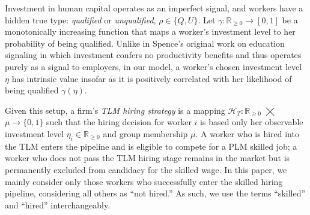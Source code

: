 \documentclass[sigconf]{acmart}
\theoremstyle{definition}
\begin{document}
Investment in human capital operates as an imperfect signal, and workers have a hidden true type: \emph{qualified} or \emph{unqualified}, $\rho \in \{Q, U\}$. Let $\gamma: \mathbb{R}_{\ge 0} \rightarrow [0,1]$ be a monotonically increasing function that maps a worker's investment level to her probability of being qualified. Unlike in Spence's original work on education signaling \cite{spence1973job} in which investment confers no productivity benefits and thus operates purely as a signal to employers, in our model, a worker's chosen investment level $\eta$ has intrinsic value insofar as it is positively correlated with her likelihood of being qualified $\gamma(\eta)$. 

Given this setup, a firm's \textit{TLM hiring strategy} is a mapping $\mathcal{H}_T: \mathbb{R}_{\ge0}$ $\bigtimes$ $\mu \rightarrow \{0,1\}$ such that the hiring decision for worker $i$ is based only her observable investment level $\eta_i \in \mathbb{R}_{\ge 0}$ and group membership $\mu$. A worker who is hired into the TLM enters the pipeline and is eligible to compete for a PLM skilled job; a worker who does not pass the TLM hiring stage remains in the market but is permanently excluded from candidacy for the skilled wage. In this paper, we mainly consider only those workers who successfully enter the skilled hiring pipeline, considering all others as ``not hired.'' As such, we use the terms ``skilled'' and ``hired'' interchangeably. 




\end{document}
